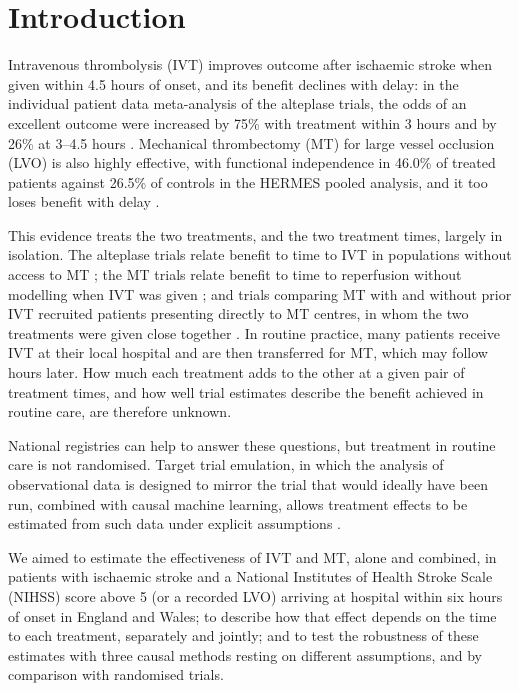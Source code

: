 \section{Introduction}

Intravenous thrombolysis (IVT) improves outcome after ischaemic stroke when given within 4.5 hours of onset, and its benefit declines with delay: in the individual patient data meta-analysis of the alteplase trials, the odds of an excellent outcome were increased by 75\% with treatment within 3 hours and by 26\% at 3--4.5 hours \cite{emberson_effect_2014}. Mechanical thrombectomy (MT) for large vessel occlusion (LVO) is also highly effective, with functional independence in 46.0\% of treated patients against 26.5\% of controls in the HERMES pooled analysis, and it too loses benefit with delay \cite{goyal2016,saver2016}.

This evidence treats the two treatments, and the two treatment times, largely in isolation. The alteplase trials relate benefit to time to IVT in populations without access to MT \cite{emberson_effect_2014}; the MT trials relate benefit to time to reperfusion without modelling when IVT was given \cite{goyal2016,saver2016}; and trials comparing MT with and without prior IVT recruited patients presenting directly to MT centres, in whom the two treatments were given close together \cite{majoie2023,kaesmacher2024}. In routine practice, many patients receive IVT at their local hospital and are then transferred for MT, which may follow hours later. How much each treatment adds to the other at a given pair of treatment times, and how well trial estimates describe the benefit achieved in routine care, are therefore unknown.

National registries can help to answer these questions, but treatment in routine care is not randomised. Target trial emulation, in which the analysis of observational data is designed to mirror the trial that would ideally have been run, combined with causal machine learning, allows treatment effects to be estimated from such data under explicit assumptions \cite{hernan2016}.

We aimed to estimate the effectiveness of IVT and MT, alone and combined, in patients with ischaemic stroke and a National Institutes of Health Stroke Scale (NIHSS) score above 5 (or a recorded LVO) arriving at hospital within six hours of onset in England and Wales; to describe how that effect depends on the time to each treatment, separately and jointly; and to test the robustness of these estimates with three causal methods resting on different assumptions, and by comparison with randomised trials.

